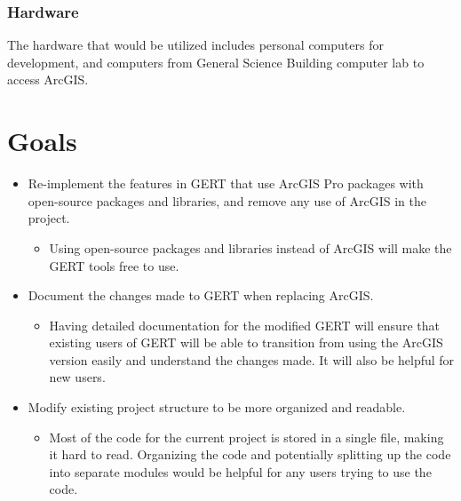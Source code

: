 \documentclass{article}
\begin{document}
    \subsubsection{Hardware}
    The hardware that would be utilized includes personal computers for development, and computers from General Science Building computer lab to access ArcGIS.


\section{Goals}
\begin{itemize}
    \item Re-implement the features in GERT that use ArcGIS Pro packages with open-source packages and libraries, and remove any use of ArcGIS in the project.
    \begin{itemize}
        \item Using open-source packages and libraries instead of ArcGIS will make the GERT tools free to use.
    \end{itemize}
    \item Document the changes made to GERT when replacing ArcGIS.
    \begin{itemize}
        \item Having detailed documentation for the modified GERT will ensure that existing users of GERT will be able to transition from using the ArcGIS version easily and understand the changes made. It will also be helpful for new users.
    \end{itemize}
    \item Modify existing project structure to be more organized and readable.
    \begin{itemize}
        \item Most of the code for the current project is stored in a single file, making it hard to read. Organizing the code and potentially splitting up the code into separate modules would be helpful for any users trying to use the code.
    \end{itemize}
\end{itemize}
\end{document}
